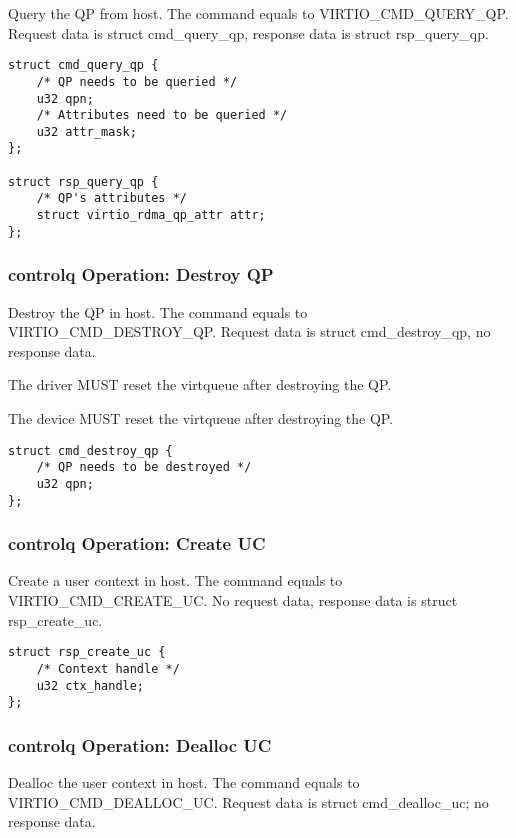 Query the QP from host. The command equals to VIRTIO_CMD_QUERY_QP.
Request data is struct cmd_query_qp, response data is struct rsp_query_qp.

\begin{lstlisting}
struct cmd_query_qp {
    /* QP needs to be queried */
    u32 qpn;
    /* Attributes need to be queried */
    u32 attr_mask;
};

struct rsp_query_qp {
    /* QP's attributes */
    struct virtio_rdma_qp_attr attr;
};
\end{lstlisting}

\subsubsection{controlq Operation: Destroy QP}\label{sec:Device Types / RDMA Device / controlq Operation / Destroy QP}


Destroy the QP in host. The command equals to VIRTIO_CMD_DESTROY_QP.
Request data is struct cmd_destroy_qp, no response data.

The driver MUST reset the virtqueue after destroying the QP.

The device MUST reset the virtqueue after destroying the QP.

\begin{lstlisting}
struct cmd_destroy_qp {
    /* QP needs to be destroyed */
    u32 qpn;
};
\end{lstlisting}

\subsubsection{controlq Operation: Create UC}\label{sec:Device Types / RDMA Device / controlq Operation / Create UC}

Create a user context in host. The command equals to VIRTIO_CMD_CREATE_UC.
No request data, response data is struct rsp_create_uc.

\begin{lstlisting}
struct rsp_create_uc {
    /* Context handle */
    u32 ctx_handle;
};
\end{lstlisting}

\subsubsection{controlq Operation: Dealloc UC}\label{sec:Device Types / RDMA Device / controlq Operation / Dealloc UC}

Dealloc the user context in host. The command equals to VIRTIO_CMD_DEALLOC_UC.
Request data is struct cmd_dealloc_uc; no response data.

